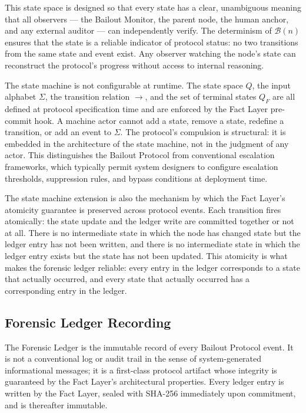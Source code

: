 This state space is designed so that every state has a clear, unambiguous meaning that all observers --- the Bailout Monitor, the parent node, the human anchor, and any external auditor --- can independently verify. The determinism of $\mathcal{B}(n)$ ensures that the state is a reliable indicator of protocol status: no two transitions from the same state and event exist. Any observer watching the node's state can reconstruct the protocol's progress without access to internal reasoning.

The state machine is not configurable at runtime. The state space $Q$, the input alphabet $\Sigma$, the transition relation $\rightarrow$, and the set of terminal states $Q_F$ are all defined at protocol specification time and are enforced by the Fact Layer pre-commit hook. A machine actor cannot add a state, remove a state, redefine a transition, or add an event to $\Sigma$. The protocol's compulsion is structural: it is embedded in the architecture of the state machine, not in the judgment of any actor. This distinguishes the Bailout Protocol from conventional escalation frameworks, which typically permit system designers to configure escalation thresholds, suppression rules, and bypass conditions at deployment time.

The state machine extension is also the mechanism by which the Fact Layer's atomicity guarantee is preserved across protocol events. Each transition fires atomically: the state update and the ledger write are committed together or not at all. There is no intermediate state in which the node has changed state but the ledger entry has not been written, and there is no intermediate state in which the ledger entry exists but the state has not been updated. This atomicity is what makes the forensic ledger reliable: every entry in the ledger corresponds to a state that actually occurred, and every state that actually occurred has a corresponding entry in the ledger.

\subsection{Forensic Ledger Recording}
\label{sec:forensic-ledger}

The Forensic Ledger is the immutable record of every Bailout Protocol event. It is not a conventional log or audit trail in the sense of system-generated informational messages; it is a first-class protocol artifact whose integrity is guaranteed by the Fact Layer's architectural properties. Every ledger entry is written by the Fact Layer, sealed with SHA-256 immediately upon commitment, and is thereafter immutable.

